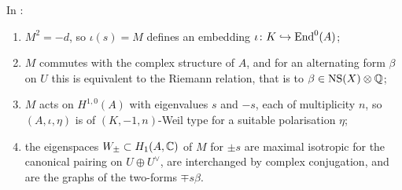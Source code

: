 \begin{theorem}\label{thm:explicitweil}
In :
\begin{enumerate}[label=\textup{(\roman*)}]
\item $M^{2}=-d$, so $\iota(s)=M$ defines an embedding
  $\iota\colon K\hookrightarrow\operatorname{End}^{0}(A)$;
\item $M$ commutes with the complex structure of $A$, and for an
  alternating form $\beta$ on $U$ this is equivalent to the Riemann relation,
  that is to $\beta\in\mathrm{NS}(X)\otimes\mathbb{Q}$;
\item $M$ acts on $H^{1,0}(A)$ with eigenvalues $s$ and $-s$, each of
  multiplicity $n$, so $(A,\iota,\eta)$ is of $(K,-1,n)$-Weil type for a
  suitable polarisation $\eta$;
\item the eigenspaces $W_{\pm}\subset H_{1}(A,\mathbb{C})$ of $M$ for $\pm s$ are
  maximal isotropic for the canonical pairing on $U\oplus U^{\vee}$, are
  interchanged by complex conjugation, and are the graphs of the two-forms
  $\mp s\beta$.
\end{enumerate}
\end{theorem}

